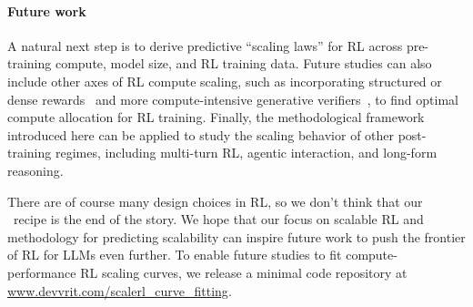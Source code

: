\paragraph{Future work}
A natural next step is to derive predictive ``scaling laws'' for RL across pre-training compute, model size, and RL training data.  Future studies can also include other axes of RL compute scaling, such as incorporating structured or dense rewards~\citep{rewardingprogresss} and more compute-intensive generative verifiers~\citep{zhang2025generativeverifiersrewardmodeling}, to find optimal compute allocation for RL training. Finally, the methodological framework introduced here can be applied to study the scaling behavior of other post-training regimes, including multi-turn RL, agentic interaction, and long-form reasoning.

There are of course many design choices in RL, so we don't think that our \scalerl\ recipe is the end of the story. We hope that our focus on scalable RL and methodology for predicting scalability can inspire future work to push the frontier of RL for LLMs even further.  To enable future studies to fit compute-performance RL scaling curves, we release a minimal code repository at \href{https://www.devvrit.com/scalerl_curve_fitting}{www.devvrit.com/scalerl\_curve\_fitting}.
